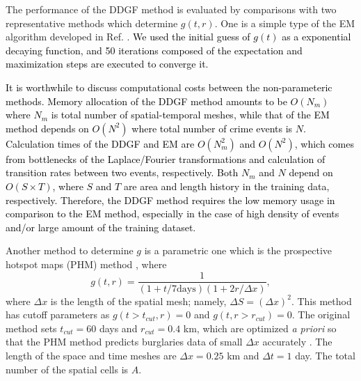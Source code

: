 \documentclass[review]{elsarticle}
\newcommand{\red}[1]{\textcolor{black}{#1}}
\begin{document}
The performance of the DDGF method is evaluated by comparisons with two representative methods which determine $g(t,r)$.
One is a simple type of the EM algorithm developed in Ref. \cite{marsan2008}.
\red{
We used the initial guess of $g(t)$ as a  exponential decaying function, and 
50 iterations 
composed of the expectation and maximization steps
are executed to converge it.
}

\red{
It is worthwhile to discuss computational costs between the non-parameteric methods.
Memory allocation of the DDGF method amounts to be $O(N_m)$ where $N_m$ is total number of spatial-temporal meshes, while that of the EM method depends on $O(N^2)$ where total number of crime events is $N$.
Calculation times of the DDGF and EM are $O(N_{m}^2)$ and $O(N^2)$, which comes from bottlenecks of the Laplace/Fourier transformations and calculation of transition rates between two events, respectively.
Both $N_m$ and $N$ depend on $O(S \times T)$, where $S$ and $T$ are area and length history in the training data, respectively.
Therefore, 
the DDGF method requires the low memory usage 
in comparison to the EM method, especially in the case of high density of events and/or large amount of the training dataset.
}

Another method to determine $g$ is a parametric one which is the prospective hotspot maps (PHM) method  \cite{bowers}, 
where
\begin{equation}
g(t,r) = \frac{1}{(1+t / 7 \textrm{days}) (1+2r /  \Delta x  )},
\nonumber
\end{equation}
where $\Delta x$ is the length of the spatial mesh; namely, $\Delta S = (\Delta x)^2$.
This method has cutoff parameters 
as $g(t>t_{cut},r)=0$ and $g(t, r>r_{cut})=0$.
The original method sets
$t_{cut} = 60$ days and $r_{cut} = 0.4$ km, which are 
optimized {\it a priori} so that the PHM method predicts burglaries data of small $\Delta x$ accurately \cite{bowers}.
The length of the space and time meshes are $\Delta x=0.25$ km and  $\Delta t=1$ day. 
The total number of the spatial cells is $A$.


\end{document}
